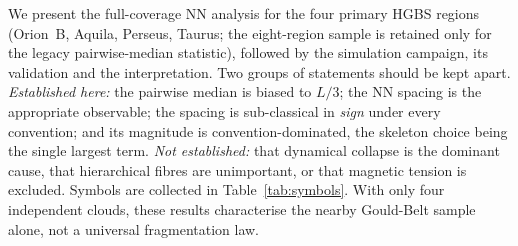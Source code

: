 \documentclass[usenatbib,twoside,twocolumn]{mnras}
\begin{document}
We present the full-coverage NN analysis for the four primary HGBS regions (Orion~B, Aquila, Perseus, Taurus; the eight-region sample is retained only for the legacy pairwise-median statistic), followed by the simulation campaign, its validation and the interpretation. Two groups of statements should be kept apart. \emph{Established here:} the pairwise median is biased to $L/3$; the NN spacing is the appropriate observable; the spacing is sub-classical in \emph{sign} under every convention; and its magnitude is convention-dominated, the skeleton choice being the single largest term. \emph{Not established:} that dynamical collapse is the dominant cause, that hierarchical fibres are unimportant, or that magnetic tension is excluded. Symbols are collected in Table~\ref{tab:symbols}. With only four independent clouds, these results characterise the nearby Gould-Belt sample alone, not a universal fragmentation law.
\end{document}
